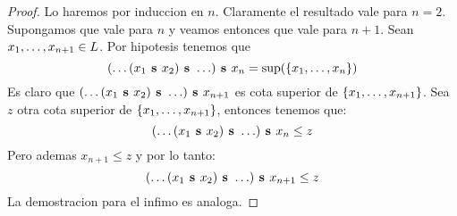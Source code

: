 \begin{proof}
  Lo haremos por induccion en $n$. Claramente el resultado vale para $n = 2$. Supongamos que vale para $n$
  y veamos entonces que vale para $n + 1$. Sean $x_{1}, \dots, x_{n+1} \in L$.
  Por hipotesis tenemos que 
  $$
  \supbin{(\dots\supbin{(\supbin{x_1}{x_2})}{\dots})}{x_n} = \sup({\{\succession{x}{1}{n}}\})
  $$
  Es claro que $\supbin{(\dots\supbin{(\supbin{x_1}{x_2})}{\dots})}{x_{n+1}}$ es cota superior de $\{x_{1}, \dots, x_{n+1}\}$. Sea $z$ otra cota superior de 
  $\{x_{1}, \dots, x_{n+1}\}$, entonces tenemos que:
  $$
  \supbin{(\dots\supbin{(\supbin{x_1}{x_2})}{\dots})}{x_n} \leq z
  $$
  Pero ademas $x_{n+1} \leq z$ y por lo tanto:
  $$
  \supbin{(\dots\supbin{(\supbin{x_1}{x_2})}{\dots})}{x_{n+1}} \leq z
  $$
  La demostracion para el infimo es analoga.

\end{proof}